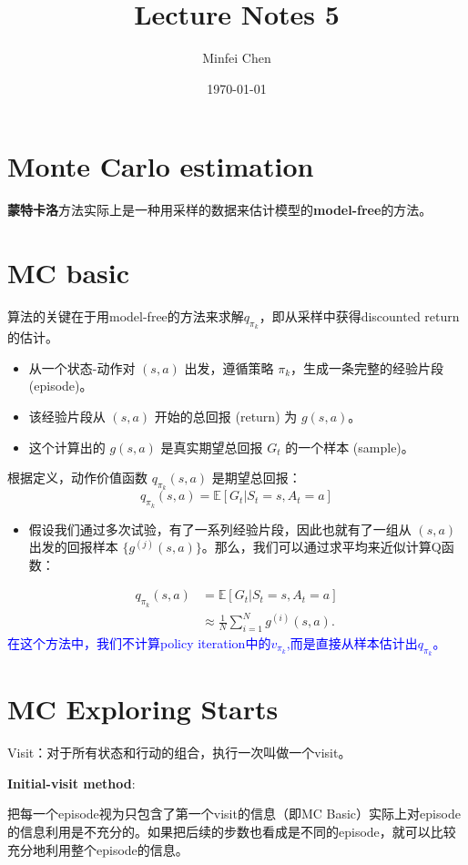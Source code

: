 \documentclass{article}
\begin{document}
\title{Lecture Notes 5}
\author{Minfei Chen}
\date{\today}
\maketitle
\section{Monte Carlo estimation}
\textbf{蒙特卡洛}方法实际上是一种用采样的数据来估计模型的\textbf{model-free}的方法。
\section{MC basic}
算法的关键在于用model-free的方法来求解${q_{\pi_k}}$，即从采样中获得discounted return的估计。
\begin{itemize}
    \item 从一个状态-动作对 $(s, a)$ 出发，遵循策略 $\pi_k$，生成一条完整的经验片段 (episode)。
    
    \item 该经验片段从 $(s, a)$ 开始的总回报 (return) 为 $g(s, a)$。
    
    \item 这个计算出的 $g(s, a)$ 是真实期望总回报 $G_t$ 的一个样本 (sample)。
\end{itemize}

根据定义，动作价值函数 $q_{\pi_k}(s, a)$ 是期望总回报：
\[
q_{\pi_k}(s, a) = \mathbb{E}[G_t | S_t = s, A_t = a]
\]

\begin{itemize}
    \item 假设我们通过多次试验，有了一系列经验片段，因此也就有了一组从 $(s, a)$ 出发的回报样本 $\{g^{(j)}(s, a)\}$。那么，我们可以通过求平均来近似计算Q函数：
\end{itemize}
\begin{align*}
    q_{\pi_k}(s, a) &= \mathbb{E}[G_t | S_t = s, A_t = a] \\
    &\approx \frac{1}{N} \sum_{i=1}^{N} g^{(i)}(s, a).
\end{align*}
\textcolor{blue}{\kaishu*在这个方法中，我们不计算policy iteration中的$v_{\pi_k}$,而是直接从样本估计出$q_{\pi_k}$。}
\section{MC Exploring Starts}
Visit：对于所有状态和行动的组合，执行一次叫做一个visit。

\textbf{Initial-visit method}:

把每一个episode视为只包含了第一个visit的信息（即MC Basic）实际上对episode的信息利用是不充分的。如果把后续的步数也看成是不同的episode，就可以比较充分地利用整个episode的信息。
\end{document}
